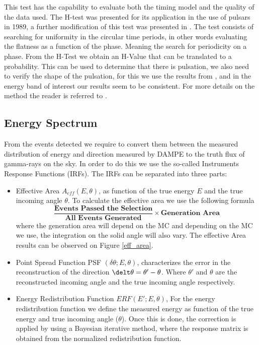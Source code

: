\documentclass{PoS}
\begin{document}
This test has the capability to evaluate both the timing model and the quality of the data used.  The H-test was presented for its application in the use of pulsars in 1989, a further  modification of this test was presented in \cite{h-test}.
The test consists of searching for uniformity in the circular time periods, in other words evaluating the flatness as a function of the phase.  Meaning the search for  periodicity on  a phase. From the H-Test we obtain an H-Value that can be translated to a probability. This can be used to determine that there is pulsation, we also need to verify the shape of the pulsation, for this we use the results from \cite{2catalogfermi}, and in the energy band of interest our results seem to be consistent. For more details on the method the reader is referred to \cite{h-test}. 






\subsection{Energy Spectrum}
From the  events detected we require to convert them between the measured distribution of energy and direction measured by DAMPE to the truth flux of gamma-rays on the sky. In order to do this we use the so-called Instruments Response Functions (IRFs). The IRFs  can be  separated into three parts: 
\begin{itemize}
    \item Effective Area $A_{eff}(E,\theta)$, as function of the true energy $E$ and the true incoming angle $\theta$.  To calculate the effective area we use the following formula
\begin{equation}
\frac{\textbf{Events Passed the Selection}}{\textbf{All Events Generated}}\times {\textbf{Generation Area}}
\end{equation} 
where the generation area will depend on the  MC and depending on the MC we use, the integration on the solid angle will also vary. The effective Area results can be observed on Figure \ref{eff_area}.
    \item Point Spread Function PSF $(\delta\theta;E,\theta)$, characterizes the error in the reconstruction of the direction $\delt \theta=\theta'-\theta $. Where $\theta'$ and $\theta$ are the reconstructed incoming angle and the true incoming angle respectively.
    \item Energy Redistribution Function $ERF (E';E,\theta)$, For the energy redistribution function we define the measured energy as function of the true energy and true incoming angle ($\theta$). Once this is done, the correction is applied by using a Bayesian iterative method, where the response matrix is obtained from the normalized redistribution function.
    
\end{itemize}
\end{document}

